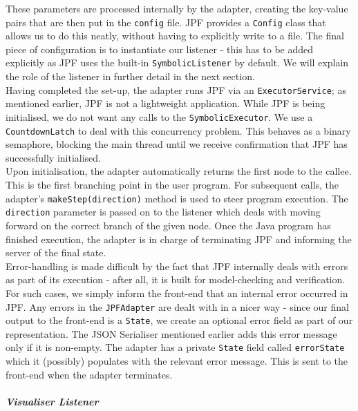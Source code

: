 \documentclass[titlepage,11pt]{article}
\begin{document}
These parameters are processed internally by the adapter, creating the key-value pairs that are then put in the \texttt{config} file. JPF provides a \texttt{Config} class that allows us to do this neatly, without having to explicitly write to a file. The final piece of configuration is to instantiate our listener - this has to be added explicitly as JPF uses the built-in \texttt{SymbolicListener} by default. We will explain the role of the listener in further detail in the next section. \\

Having completed the set-up, the adapter runs JPF via an \texttt{ExecutorService}; as mentioned earlier, JPF is not a lightweight application. While JPF is being initialised, we do not want any calls to the \texttt{SymbolicExecutor}. We use a \texttt{CountdownLatch} to deal with this concurrency problem. This behaves as a binary semaphore, blocking the main thread until we receive confirmation that JPF has successfully initialised. \\

Upon initialisation, the adapter automatically returns the first node to the callee. This is the first branching point in the user program. For subsequent calls, the adapter's \texttt{makeStep(direction)} method is used to steer program execution. The \texttt{direction} parameter is passed on to the listener which deals with moving forward on the correct branch of the given node. Once the Java program has finished execution, the adapter is in charge of terminating JPF and informing the server of the final state. \\

Error-handling is made difficult by the fact that JPF internally deals with errors as part of its execution - after all, it is built for model-checking and verification. For such cases, we simply inform the front-end that an internal error occurred in JPF. Any errors in the \texttt{JPFAdapter} are dealt with in a nicer way - since our final output to the front-end is a \texttt{State}, we create an optional error field as part of our representation. The JSON Serialiser mentioned earlier adds this error message only if it is non-empty. The adapter has a private \texttt{State} field called \texttt{errorState} which it (possibly) populates with the relevant error message. This is sent to the front-end when the adapter terminates.

\subparagraph*{\textbf{Visualiser Listener}}\mbox{}\\
\end{document}
